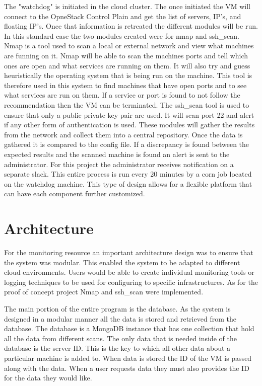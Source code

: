 \documentclass[12pt]{article}
\begin{document}
The "watchdog" is initiated in the cloud cluster. The once initiated the VM will connect to the OpneStack Control Plain and get the list of servers, IP's, and floating IP's. Once that information is retreated the different modules will be run. In this standard case the two modules created were for nmap and ssh\_scan. Nmap is a tool used to scan a local or external network and view what machines are funning on it. Nmap will be able to scan the machines ports and tell which ones are open and what services are running on them. It will also try and guess heuristically the operating system that is being run on the machine. This tool is therefore used in this system to find machines that have open ports and to see what services are run on them. If a service or port is found to not follow the recommendation then the VM can be terminated. The ssh\_scan tool is used to ensure that only a public private key pair are used. It will scan port 22 and alert if any other form of authentication is used.
These modules will gather the results from the network and collect them into a central repository. Once the data is gathered it is compared to the config file.  If a discrepancy is found between the expected results and the scanned machine is found an alert is sent to the administrator. For this project the administrator receives notification on a separate slack. This entire process is run every 20 minutes by a corn job located on the watchdog machine. This type of design allows for a flexible platform that can have each component further customized.

\section{Architecture}
For the monitoring resource an important architecture design was to ensure that the system was modular. This enabled the system to be adapted to different cloud environments. Users would be able to create individual monitoring tools or logging techniques to be used for configuring to specific infrastructures. As for the proof of concept project Nmap and ssh\_scan were implemented.


The main portion of the entire program is the database. As the system is designed in a modular manner all the data is stored and retrieved from the database. The database is a MongoDB instance that has one collection that hold all the data from different scans. The only data that is needed inside of the database is the server ID\@. This is the key to which all other data about a particular machine is added to. When data is stored the ID of the VM is passed along with the data. When a user requests data they must also provides the ID for the data they would like.
\end{document}
